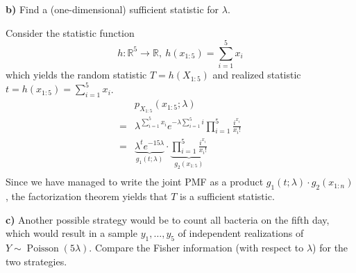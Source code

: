 \documentclass{article}
\begin{document}
\begin{ssubproblem}
\textbf{b)} Find a (one-dimensional) sufficient statistic for \(\lambda\).
\end{ssubproblem}

\begin{ssolution}
Consider the statistic function
\[h: \mathbb{R}^5 \to \mathbb{R}, \ h(x_{1:5}) = \sum_{i=1}^5 x_i\]
which yields the random statistic \(T=h(X_{1:5})\) and realized statistic \(t = h(x_{1:5}) = \sum_{i=1}^5 x_i\).
\begin{align*}
	& p_{X_{1:5}}(x_{1:5};\lambda) \\
	=& \lambda^{\sum_{i=1}^5 x_i} e^{-\lambda \sum_{i=1}^5 i}\prod_{i=1}^5\frac{i^{x_i}}{x_i !} \\
	=& \underbrace{\lambda^t e^{-15\lambda}}_{g_1(t;\lambda)} \cdot \underbrace{\prod_{i=1}^5\frac{i^{x_i}}{x_i !}}_{g_2(x_{1:5})} \\
\end{align*}
Since we have managed to write the joint PMF as a product \(g_1(t;\lambda)\cdot g_2(x_{1:n})\),
the factorization theorem yields that
\(T\) is a sufficient statistic.
\end{ssolution}

\begin{ssubproblem}
\textbf{c)}
Another possible strategy would be to count all bacteria on the fifth day,
which would result in a sample \(y_1, \ldots , y_5\) of independent
realizations of \(Y \sim \operatorname{Poisson}(5\lambda)\). Compare the Fisher
information (with respect to \(\lambda\)) for the two strategies.
\end{ssubproblem}
\end{document}
